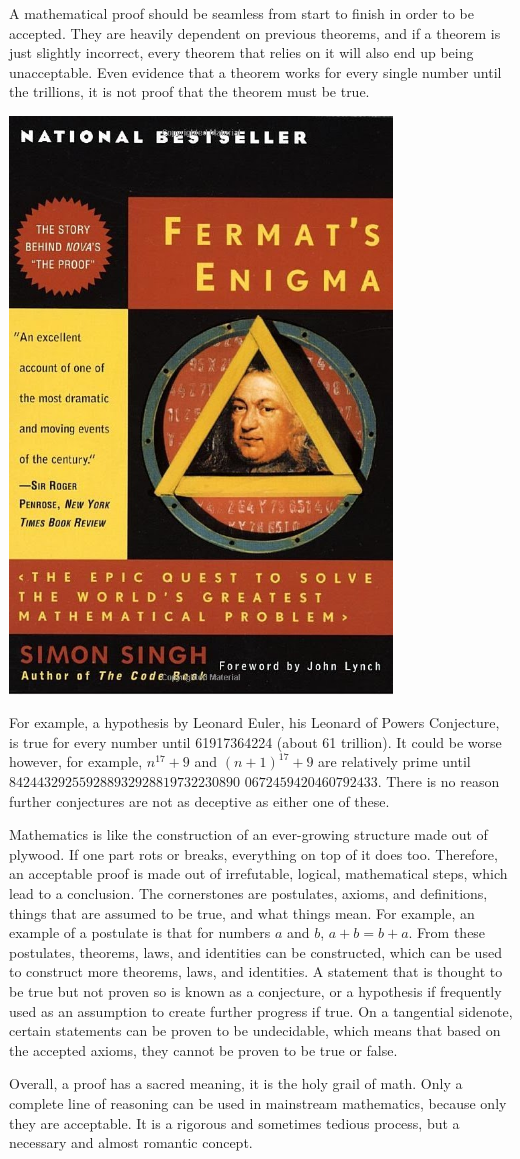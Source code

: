 \documentclass{article}
\begin{document}
 
A mathematical proof should be seamless from start to finish in order to be accepted. They are heavily dependent on previous theorems, and if a theorem is just slightly incorrect, every theorem that relies on it will also end up being unacceptable. Even evidence that a theorem works for every single number until the trillions, it is not proof that the theorem must be true.
\begin{center}
   \includegraphics[width=4in,scale=0.25]{images/fermats_enigma.jpg}
\end{center}
For example, a hypothesis by Leonard Euler, his Leonard of Powers Conjecture, is true for every number until 61917364224 (about 61 trillion). It could be worse however, for example, $n^{17}+9$ and $(n+1)^{17} + 9$ are relatively prime until $842443292559288932928819732230890$
$0672459420460792433$. There is no reason further conjectures are not as deceptive as either one of these. 

Mathematics is like the construction of an ever-growing structure made out of plywood. If one part rots or breaks, everything on top of it does too. Therefore, an acceptable proof is made out of irrefutable, logical, mathematical steps, which lead to a conclusion. The cornerstones are postulates, axioms, and definitions, things that are assumed to be true, and what things mean. For example, an example of a postulate is that for numbers $a$ and $b$, $a + b = b + a$. From these postulates, theorems, laws, and identities can be constructed, which can be used to construct more theorems, laws, and identities. A statement that is thought to be true but not proven so is known as a conjecture, or a hypothesis if frequently used as an assumption to create further progress if true. On a tangential sidenote, certain statements can be proven to be undecidable, which means that based on the accepted axioms, they cannot be proven to be true or false. 

Overall, a proof has a sacred meaning, it is the holy grail of math. Only a complete line of reasoning can be used in mainstream mathematics, because only they are acceptable. It is a rigorous and sometimes tedious process, but a necessary and almost romantic concept.
\end{document}
